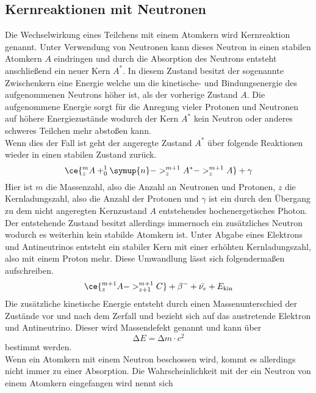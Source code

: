 \subsection{Kernreaktionen mit Neutronen}
Die Wechselwirkung eines Teilchens mit einem Atomkern wird Kernreaktion genannt. 
Unter Verwendung von Neutronen kann dieses Neutron in einen stabilen Atomkern $A$ eindringen und durch die Absorption des Neutrons
entsteht anschließend ein neuer Kern $A^{*}$. In diesem Zustand besitzt der sogenannte Zwischenkern eine Energie welche um die kinetische- und Bindungsenergie
des aufgenommenen Neutrons höher ist, als der vorherige Zustand $A$. Die aufgenommene Energie sorgt für die Anregung vieler Protonen und Neutronen auf höhere Energiezustände
wodurch der Kern $A^{*}$ kein Neutron oder anderes schweres Teilchen mehr abstoßen kann. 
\\
Wenn dies der Fall ist geht der angeregte Zustand $A^{*}$ über folgende Reaktionen wieder in einen stabilen Zustand zurück.
\begin{equation}
    \ce{^{m}_{z}A + ^{1}_{0}\symup{n} -> ^{m+1}_{z}A^{*} -> ^{m+1}_{z}A} + \gamma
\end{equation}
Hier ist $m$ die Massenzahl, also die Anzahl an Neutronen und Protonen, $z$ die Kernladungszahl, also die Anzahl der Protonen und $\gamma$ ist ein durch den Übergang zu dem nicht angeregten Kernzustand $A$
entstehendes hochenergetisches Photon.
\\
Der entstehende Zustand besitzt allerdings immernoch ein zusätzliches Neutron wodurch es weiterhin kein stabilde Atomkern ist. Unter Abgabe eines Elektrons und Antineutrinos entsteht ein stabiler Kern
mit einer erhöhten Kernladungszahl, also mit einem Proton mehr. Diese Umwandlung lässt sich folgendermaßen aufschreiben.
\begin{equation}
\ce{^{m+1}_{z}A -> ^{m+1}_{z+1}C} +\beta^{-} + \bar{\nu_{e}} + E_{\text{kin}}
\end{equation}
Die zusätzliche kinetische Energie entsteht durch einen Massenunterschied der Zustände vor und nach dem Zerfall und bezieht sich auf das austretende Elektron und Antineutrino. Dieser wird
Massendefekt genannt und kann über 
\begin{equation}
\label{eqn:einsteineq}
\increment E = \increment m \cdot c^2
\end{equation}
bestimmt werden. 
\\
Wenn ein Atomkern mit einem Neutron beschossen wird, kommt es allerdings nicht immer zu einer Absorption. Die Wahrscheinlichkeit mit der ein Neutron von einem Atomkern eingefangen wird nennt sich
